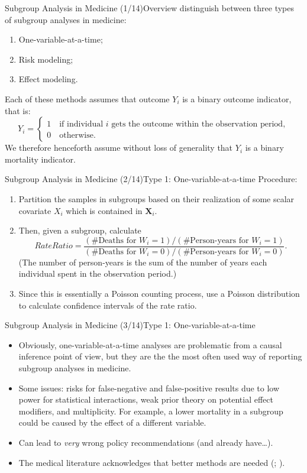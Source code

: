 \documentclass[11pt]{beamer}
\begin{document}
\begin{frame}{Subgroup Analysis in Medicine (1/14)}{Overview}
\cite{kent2018} distinguish between three types of subgroup analyses in medicine:

\begin{enumerate}
\item One-variable-at-a-time;
\item Risk modeling;
\item Effect modeling.
\end{enumerate}

Each of these methods assumes that outcome $Y_i$ is a binary outcome indicator, that is:
\[
Y_i =
\begin{cases}
1 \quad \text{if individual $i$ gets the outcome within the observation period},\\
0 \quad \text{otherwise}.
\end{cases}
\]
We therefore henceforth assume without loss of generality that $Y_i$ is  a binary mortality indicator.
\end{frame}


\begin{frame}{Subgroup Analysis in Medicine (2/14)}{Type 1: One-variable-at-a-time}
Procedure:
\begin{enumerate}
	\item Partition the samples in subgroups based on their realization of some scalar covariate $X_i$ which is contained in $\mathbf{X}_i$.
	\item Then, given a subgroup, calculate
	\[ 
		Rate Ratio = \frac{(\# \text{Deaths for } W_i=1) / (\# \text{Person-years for } W_i=1)}{(\# \text{Deaths for } W_i=0) / (\# \text{Person-years for } W_i=0)}.
	\]
	(The number of person-years is the sum of the number of years each individual spent in the observation period.) 
	\item Since this is essentially a Poisson counting process, use a Poisson distribution to calculate confidence intervals of the rate ratio.
\end{enumerate}
\end{frame}


\begin{frame}{Subgroup Analysis in Medicine (3/14)}{Type 1: One-variable-at-a-time}
\begin{itemize}
\item Obviously, one-variable-at-a-time analyses are problematic from a causal inference point of view, but they are the \alert{the most often used way of reporting subgroup analyses in medicine.}
\item Some issues: risks for false-negative and false-positive results due to low power for statistical interactions, weak prior theory on potential effect modifiers, and multiplicity. For example, a lower mortality in a subgroup could be caused by the effect of a different variable.
\item[\ding{212}] Can lead to \textit{very} wrong policy recommendations (and already have\dots).
\item The medical literature acknowledges that better methods are needed (\citealp{kent2018}; \citealp{kent2020}).
\end{itemize}
\end{frame}
\end{document}
